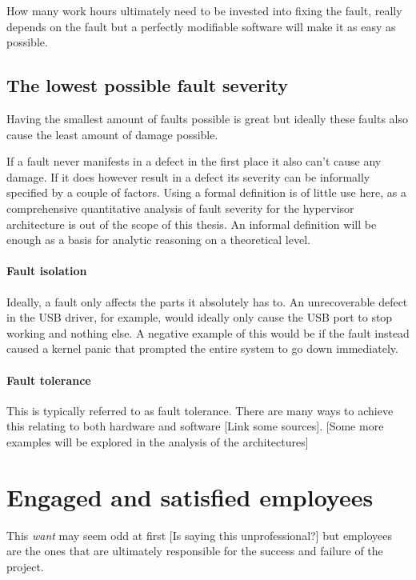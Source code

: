How many work hours ultimately need to be invested into fixing the fault, really depends on the fault but a perfectly modifiable software will make it as easy as possible.
\subsection{The lowest possible fault severity}
Having the smallest amount of faults possible is great but ideally these faults also cause the least amount of damage possible. 

If a fault never manifests in a defect in the first place it also can't cause any damage. If it does however result in a defect its severity can be informally specified by a couple of factors. Using a formal definition is of little use here, as a comprehensive quantitative analysis of fault severity for the hypervisor architecture is out of the scope of this thesis. An informal definition will be enough as a basis for analytic reasoning on a theoretical level.
\paragraph{Fault isolation}
Ideally,  a fault only affects the parts it absolutely has to. An unrecoverable defect in the USB driver, for example, would ideally only cause the USB port to stop working and nothing else. A negative example of this would be if the fault instead caused a kernel panic that prompted the entire system to go down immediately.
\paragraph{Fault tolerance}
This is typically referred to as fault tolerance. There are many ways to achieve this relating to both hardware and software [Link some sources]. [Some more examples will be explored in the analysis of the architectures]

\section{Engaged and satisfied employees}
This \textit{want} may seem odd at first [Is saying this unprofessional?] but employees are the ones that are ultimately responsible for the success and failure of the project.


